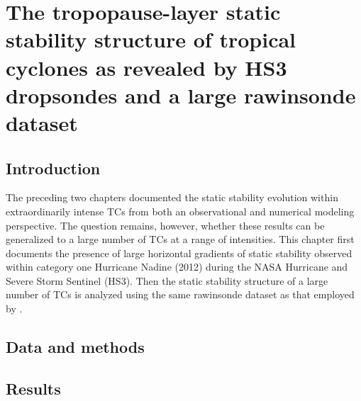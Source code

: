  
\chapter{The tropopause-layer static stability structure of tropical cyclones as revealed by HS3 dropsondes and a large rawinsonde dataset}
\resetfootnote %

\section{Introduction}

The preceding two chapters documented the static stability evolution within extraordinarily intense TCs from both an observational and numerical modeling perspective.
The question remains, however, whether these results can be generalized to a large number of TCs at a range of intensities.
This chapter first documents the presence of large horizontal gradients of static stability observed within category one Hurricane Nadine (2012) during the NASA Hurricane and Severe Storm Sentinel (HS3).
Then the static stability structure of a large number of TCs is analyzed using the same rawinsonde dataset as that employed by \cite{DuranMolinari2016}.

\section{Data and methods}

\section{Results}

